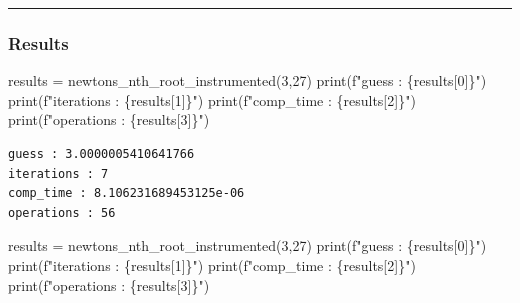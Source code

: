 \documentclass[
  letterpaper,
  DIV=11,
  numbers=noendperiod]{scrartcl}
\newenvironment{Shaded}{\begin{snugshade}}{\end{snugshade}}
\newcommand{\BuiltInTok}[1]{\textcolor[rgb]{0.00,0.23,0.31}{#1}}
\newcommand{\DecValTok}[1]{\textcolor[rgb]{0.68,0.00,0.00}{#1}}
\newcommand{\NormalTok}[1]{\textcolor[rgb]{0.00,0.23,0.31}{#1}}
\newcommand{\OperatorTok}[1]{\textcolor[rgb]{0.37,0.37,0.37}{#1}}
\newcommand{\SpecialCharTok}[1]{\textcolor[rgb]{0.37,0.37,0.37}{#1}}
\newcommand{\SpecialStringTok}[1]{\textcolor[rgb]{0.13,0.47,0.30}{#1}}
\begin{document}
\begin{center}\rule{0.5\linewidth}{0.5pt}\end{center}

\subsubsection{Results}\label{results}

\begin{Shaded}
\begin{Highlighting}[]
\NormalTok{results }\OperatorTok{=}\NormalTok{ newtons\_nth\_root\_instrumented(}\DecValTok{3}\NormalTok{,}\DecValTok{27}\NormalTok{)}
\BuiltInTok{print}\NormalTok{(}\SpecialStringTok{f"guess : }\SpecialCharTok{\{}\NormalTok{results[}\DecValTok{0}\NormalTok{]}\SpecialCharTok{\}}\SpecialStringTok{"}\NormalTok{)}
\BuiltInTok{print}\NormalTok{(}\SpecialStringTok{f"iterations : }\SpecialCharTok{\{}\NormalTok{results[}\DecValTok{1}\NormalTok{]}\SpecialCharTok{\}}\SpecialStringTok{"}\NormalTok{)}
\BuiltInTok{print}\NormalTok{(}\SpecialStringTok{f"comp\_time : }\SpecialCharTok{\{}\NormalTok{results[}\DecValTok{2}\NormalTok{]}\SpecialCharTok{\}}\SpecialStringTok{"}\NormalTok{)}
\BuiltInTok{print}\NormalTok{(}\SpecialStringTok{f"operations : }\SpecialCharTok{\{}\NormalTok{results[}\DecValTok{3}\NormalTok{]}\SpecialCharTok{\}}\SpecialStringTok{"}\NormalTok{)}
\end{Highlighting}
\end{Shaded}

\begin{verbatim}
guess : 3.0000005410641766
iterations : 7
comp_time : 8.106231689453125e-06
operations : 56
\end{verbatim}

\begin{Shaded}
\begin{Highlighting}[]
\NormalTok{results }\OperatorTok{=}\NormalTok{ newtons\_nth\_root\_instrumented(}\DecValTok{3}\NormalTok{,}\DecValTok{27}\NormalTok{)}
\BuiltInTok{print}\NormalTok{(}\SpecialStringTok{f"guess : }\SpecialCharTok{\{}\NormalTok{results[}\DecValTok{0}\NormalTok{]}\SpecialCharTok{\}}\SpecialStringTok{"}\NormalTok{)}
\BuiltInTok{print}\NormalTok{(}\SpecialStringTok{f"iterations : }\SpecialCharTok{\{}\NormalTok{results[}\DecValTok{1}\NormalTok{]}\SpecialCharTok{\}}\SpecialStringTok{"}\NormalTok{)}
\BuiltInTok{print}\NormalTok{(}\SpecialStringTok{f"comp\_time : }\SpecialCharTok{\{}\NormalTok{results[}\DecValTok{2}\NormalTok{]}\SpecialCharTok{\}}\SpecialStringTok{"}\NormalTok{)}
\BuiltInTok{print}\NormalTok{(}\SpecialStringTok{f"operations : }\SpecialCharTok{\{}\NormalTok{results[}\DecValTok{3}\NormalTok{]}\SpecialCharTok{\}}\SpecialStringTok{"}\NormalTok{)}
\end{Highlighting}
\end{Shaded}
\end{document}
